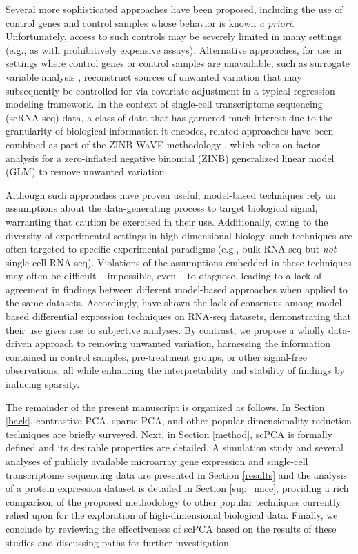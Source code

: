 Several more sophisticated approaches have been proposed, including the use of control genes \citep{gagnon2012using, risso2014normalization} and control samples \citep{gagnon2013removing} whose behavior is known \textit{a priori}. Unfortunately, access to such controls may be severely limited in many settings (e.g., as with prohibitively expensive assays). Alternative approaches, for use in settings where control genes or control samples are unavailable, such as surrogate variable analysis \citep{leek2007capturing}, reconstruct sources of unwanted variation that may subsequently be controlled for via covariate adjustment in a typical regression modeling framework. In the context of single-cell transcriptome sequencing (scRNA-seq) data, a class of data that has garnered much interest due to the granularity of biological information it encodes, related approaches have been combined as part of the ZINB-WaVE methodology \citep{risso2017zinb}, which relies on factor analysis for a zero-inflated negative binomial (ZINB) generalized linear model (GLM) to remove unwanted variation.

Although such approaches have proven useful, model-based techniques rely on assumptions about the data-generating process to target biological signal, warranting that caution be exercised in their use. Additionally, owing to the diversity of experimental settings in high-dimensional biology, such techniques are often targeted to specific experimental paradigms (e.g., bulk RNA-seq but \textit{not} single-cell RNA-seq). Violations of the assumptions embedded in these techniques may often be difficult -- impossible, even -- to diagnose, leading to a lack of agreement in findings between different model-based approaches when applied to the same datasets. Accordingly, \citet{zhang2014} have shown the lack of consensus among model-based differential expression techniques on RNA-seq datasets, demonstrating that their use gives rise to subjective analyses. By contrast, we propose a wholly data-driven approach to removing unwanted variation, harnessing the information contained in control samples, pre-treatment groups, or other signal-free observations, all while enhancing the interpretability and stability of findings by inducing sparsity.

The remainder of the present manuscript is organized as follows. In Section \ref{back}, contrastive PCA, sparse PCA, and other popular dimensionality reduction techniques are briefly surveyed. Next, in Section \ref{method}, scPCA is formally defined and its desirable properties are detailed. A simulation study and several analyses of publicly available microarray gene expression and single-cell transcriptome sequencing data are presented in Section \ref{results} and the analysis of a protein expression dataset is detailed in Section \ref{sup_mice}, providing a rich comparison of the proposed methodology to other popular techniques currently relied upon for the exploration of high-dimensional biological data. Finally, we conclude by reviewing the effectiveness of scPCA based on the results of these studies and discussing paths for further investigation. 

